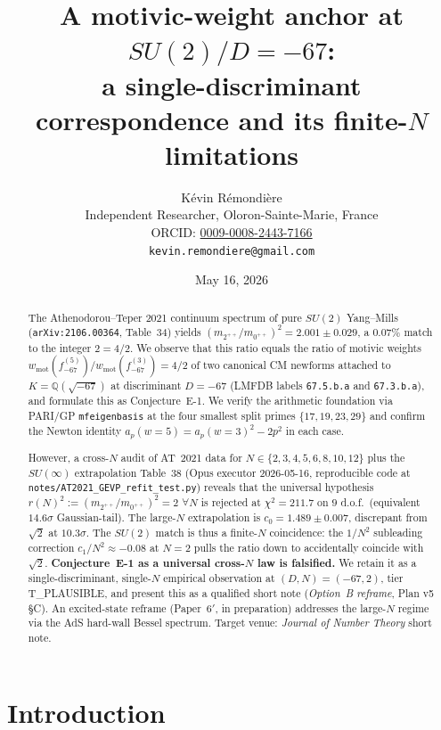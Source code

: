 \documentclass[11pt,a4paper]{amsart}
\title{A motivic-weight anchor at $SU(2)/D=-67$:\\
a single-discriminant correspondence and its finite-$N$ limitations}
\author{K\'evin R\'emondi\`ere\\
\small Independent Researcher, Oloron-Sainte-Marie, France\\
\small ORCID: \href{https://orcid.org/0009-0008-2443-7166}{0009-0008-2443-7166}\\
\small \texttt{kevin.remondiere@gmail.com}}
\date{May 16, 2026}
\theoremstyle{definition}
\begin{document}
\maketitle

\begin{abstract}
The Athenodorou--Teper 2021 continuum spectrum of pure $SU(2)$ Yang--Mills
(\texttt{arXiv:2106.00364}, Table~34) yields
$(m_{2^{++}}/m_{0^{++}})^{2} = 2.001 \pm 0.029$,
a $0.07\%$ match to the integer $2 = 4/2$.
We observe that this ratio equals the ratio of motivic weights
$w_{\mathrm{mot}}(f_{-67}^{(5)})/w_{\mathrm{mot}}(f_{-67}^{(3)}) = 4/2$
of two canonical CM newforms attached to $K = \mathbb{Q}(\sqrt{-67})$ at discriminant
$D = -67$ (LMFDB labels \texttt{67.5.b.a} and \texttt{67.3.b.a}),
and formulate this as Conjecture~E-1.
We verify the arithmetic foundation via PARI/GP \texttt{mfeigenbasis} at the
four smallest split primes $\{17, 19, 23, 29\}$ and confirm the Newton identity
$a_{p}(w=5) = a_{p}(w=3)^{2} - 2p^{2}$ in each case.

However, a cross-$N$ audit of AT~2021 data for $N \in \{2,3,4,5,6,8,10,12\}$
plus the $SU(\infty)$ extrapolation Table~38 (Opus executor 2026-05-16,
reproducible code at \texttt{notes/AT2021\_GEVP\_refit\_test.py}) reveals
that the universal hypothesis $r(N)^{2} := (m_{2^{++}}/m_{0^{++}})^{2} = 2$
$\forall N$ is rejected at $\chi^{2} = 211.7$ on $9$ d.o.f.\ (equivalent
$14.6\sigma$ Gaussian-tail). The large-$N$ extrapolation is
$c_{0} = 1.489 \pm 0.007$, discrepant from $\sqrt{2}$ at $10.3\sigma$.
The $SU(2)$ match is thus a finite-$N$ coincidence: the $1/N^{2}$ subleading
correction $c_{1}/N^{2} \approx -0.08$ at $N=2$ pulls the ratio down to
accidentally coincide with $\sqrt{2}$. \textbf{Conjecture~E-1 as a
universal cross-$N$ law is falsified.} We retain it as a single-discriminant,
single-$N$ empirical observation at $(D, N) = (-67, 2)$, tier T\_PLAUSIBLE,
and present this as a qualified short note (\emph{Option~B reframe},
Plan v5 \S C). An excited-state reframe (Paper~6$'$, in preparation)
addresses the large-$N$ regime via the AdS hard-wall Bessel spectrum.
Target venue: \emph{Journal of Number Theory} short note.
\end{abstract}

\section{Introduction}
\end{document}
